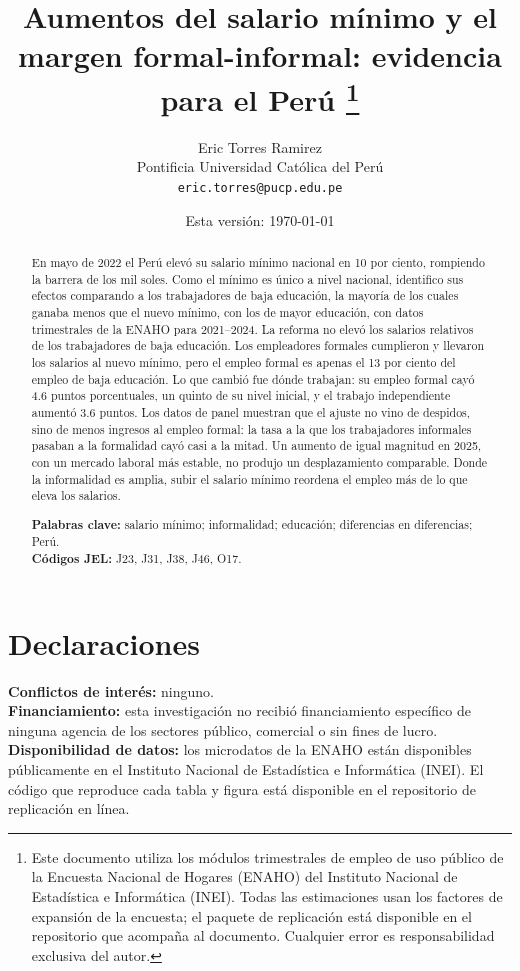 \documentclass[12pt]{article}
\title{\textbf{Aumentos del salario mínimo y el margen formal-informal: evidencia para el Perú} \thanks{Este documento utiliza los módulos trimestrales de empleo de uso público de la Encuesta Nacional de Hogares (ENAHO) del Instituto Nacional de Estadística e Informática (INEI). Todas las estimaciones usan los factores de expansión de la encuesta; el paquete de replicación está disponible en el repositorio que acompaña al documento. Cualquier error es responsabilidad exclusiva del autor.}}
\author{Eric Torres Ramirez\\
  \small Pontificia Universidad Católica del Perú\\
  \small \texttt{eric.torres@pucp.edu.pe}}
\date{Esta versión: \today}
\begin{document}
\maketitle

\begin{abstract}
\noindent En mayo de 2022 el Perú elevó su salario mínimo nacional en 10 por ciento, rompiendo la barrera de los mil soles. Como el mínimo es único a nivel nacional, identifico sus efectos comparando a los trabajadores de baja educación, la mayoría de los cuales ganaba menos que el nuevo mínimo, con los de mayor educación, con datos trimestrales de la ENAHO para 2021--2024. La reforma no elevó los salarios relativos de los trabajadores de baja educación. Los empleadores formales cumplieron y llevaron los salarios al nuevo mínimo, pero el empleo formal es apenas el 13 por ciento del empleo de baja educación. Lo que cambió fue dónde trabajan: su empleo formal cayó 4.6 puntos porcentuales, un quinto de su nivel inicial, y el trabajo independiente aumentó 3.6 puntos. Los datos de panel muestran que el ajuste no vino de despidos, sino de menos ingresos al empleo formal: la tasa a la que los trabajadores informales pasaban a la formalidad cayó casi a la mitad. Un aumento de igual magnitud en 2025, con un mercado laboral más estable, no produjo un desplazamiento comparable. Donde la informalidad es amplia, subir el salario mínimo reordena el empleo más de lo que eleva los salarios.

\medskip
\noindent\textbf{Palabras clave:} salario mínimo; informalidad; educación; diferencias en diferencias; Perú.\\
\noindent\textbf{Códigos JEL:} J23, J31, J38, J46, O17.
\end{abstract}

\newpage
{}












\section*{Declaraciones}
\noindent\textbf{Conflictos de interés:} ninguno.\\
\textbf{Financiamiento:} esta investigación no recibió financiamiento específico de ninguna agencia de los sectores público, comercial o sin fines de lucro.\\
\textbf{Disponibilidad de datos:} los microdatos de la ENAHO están disponibles públicamente en el Instituto Nacional de Estadística e Informática (INEI). El código que reproduce cada tabla y figura está disponible en el repositorio de replicación en línea.

\newpage


\newpage
\appendix

\end{document}
